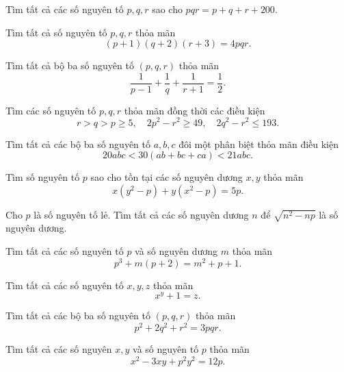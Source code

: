\begin{btt}
Tìm tất cả các số nguyên tố $p,q,r$ sao cho $pqr=p+q+r+200.$
\end{btt}

\begin{btt}
Tìm tất cả số nguyên tố $p,q,r$ thỏa mãn 
\[(p+1)(q+2)(r+3)=4pqr.\]
\end{btt} 

\begin{btt}
Tìm tất cả bộ ba số nguyên tố $(p,q,r)$ thỏa mãn \[\dfrac{1}{p-1}+\dfrac{1}{q}+\dfrac{1}{r+1}=\dfrac{1}{2}.\]
\end{btt}

\begin{btt}
Tìm các số nguyên tố $ p,q,r$ thỏa mãn đồng thời các điều kiện
\[r>q>p\ge 5,\quad 2p^2-r^2\ge 49,\quad 2q^2-r^2\le 193.\]
\end{btt}

\begin{btt}
Tìm tất cả các bộ ba số nguyên tố $a, b, c$ đôi một phân biệt thỏa mãn điều kiện
\[20abc<30(ab+bc+ca)<21abc.\]
\end{btt} 

\begin{btt}
Tìm số nguyên tố $p$ sao cho tồn tại các số nguyên dương $x,y$ thỏa mãn
\[x\left(y^2-p\right)+y\left(x^2-p\right)=5p.\]
\end{btt}

\begin{btt}
Cho $p$ là số nguyên tố lẻ. Tìm tất cả các số nguyên dương $n$ để $\sqrt{n^{2}-np}$ là số nguyên dương.
\end{btt}

\begin{btt}
Tìm tất cả các số nguyên tố $p$ và số nguyên dương $m$ thỏa mãn \[p^{3}+m(p+2)=m^{2}+p+1.\]
\end{btt}

\begin{btt}
Tìm tất cả các số nguyên tố $x,y,z$ thỏa mãn  \[x^y+1=z.\]
\end{btt}

\begin{btt}
Tìm tất cả các bộ ba số nguyên tố $\left ( p,q,r \right )$ thỏa mãn
    $$p^{2}+2 q^{2}+r^{2}=3pqr.$$
\end{btt}

\begin{btt}
Tìm tất cả các số nguyên $x, y$ và số nguyên tố $p$ thỏa mãn
\[x^2-3xy+p^2y^2=12p.\]
\end{btt}

